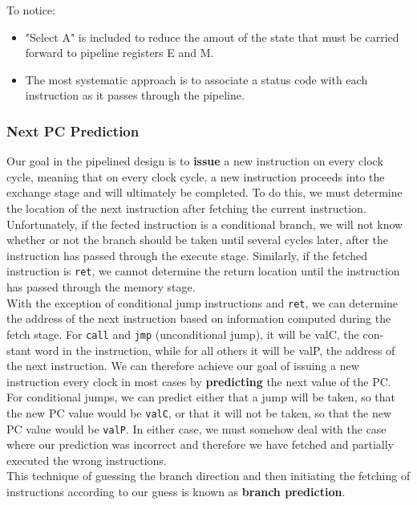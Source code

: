 \documentclass[11pt]{article}
\begin{document}
To notice:\\
\begin{itemize}
\item "Select A" is included to reduce the amout of the state that must be carried forward to pipeline registers E and M.\\
\item The most systematic approach is to associate a status code with each instruction as it passes through the pipeline.\\
\end{itemize}



\subsubsection{Next PC Prediction}
\label{sec:org202ef03}
Our goal in the pipelined design is to \textbf{issue} a new instruction on every clock cycle, meaning that on every clock cycle, a new instruction proceeds into the exchange stage and will ultimately be completed. To do this, we must determine the location of the next instruction after fetching the current instruction. Unfortunately, if the fected instruction is a conditional branch, we will not know whether or not the branch should be taken until several cycles later, after the instruction has passed through the execute stage. Similarly, if the fetched instruction is \texttt{ret}, we cannot determine the return location until the instruction has passed through the memory stage.\\

With the exception of conditional jump instructions and \texttt{ret}, we can determine the address of the next instruction based on information computed during the fetch stage. For \texttt{call} and \texttt{jmp} (unconditional jump), it will be valC, the con- stant word in the instruction, while for all others it will be valP, the address of the next instruction. We can therefore achieve our goal of issuing a new instruction every clock in most cases by \textbf{predicting} the next value of the PC. For conditional jumps, we can predict either that a jump will be taken, so that the new PC value would be \texttt{valC}, or that it will not be taken, so that the new PC value would be \texttt{valP}. In either case, we must somehow deal with the case where our prediction was incorrect and therefore we have fetched and partially executed the wrong instructions.\\


This technique of guessing the branch direction and then initiating the fetching of instructions according to our guess is known as \textbf{branch prediction}.\\
\end{document}
